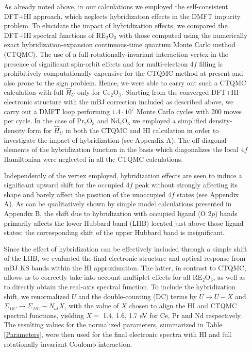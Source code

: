 \documentclass[aps,prb,twocolumn,amsmath,amssymb]{revtex4}
\begin{document}
As already noted above, in our calculations we employed the self-consistent DFT+HI approach, which neglects hybridization effects in the DMFT impurity problem. To elucidate the impact of  hybridization effects, we compared  the DFT+HI spectral functions of RE$_2$O$_3$ with those computed using the numerically exact hybridization-expansion continuous-time quantum Monte Carlo method (CTQMC)\cite{Werner2006,triqs_main,Seth2016}. The use of a full rotationally-invariant interaction vertex in the presence of significant spin-orbit effects and for multi-electron 4$f$ filling is prohibitively computationally expensive for the CTQMC method at present and also prone to the sign problem\cite{Gull2011}. Hence, we were able to carry out such a CTQMC calculation with full $\hat{H}_U$ only for Ce$_2$O$_3$.  Starting from the converged DFT+HI electronic structure with the mBJ correction included as described above, we carry out a DMFT loop performing $1.4\cdot10^{7}$ Monte Carlo cycles with 200 moves per cycle. In the case of Pr$_2$O$_3$ and Nd$_2$O$_3$ we employed  a simplified density-density form for $\hat{H}_{U}$ in both the  CTQMC and HI calculation in order to investigate the impact of hybridization (see Appendix A). The off-diagonal elements of the hybridization function in the basis which diagonalizes the local 4$f$ Hamiltonian were neglected in all the CTQMC calculations.


Independently of the vertex employed,  hybridization effects are seen to induce a significant upward shift for the occupied 4$f$ peak without strongly affecting its shape and barely affect the position of the unoccupied 4$f$ states (see Appendix A).  As can be qualitatively shown by simple model calculations presented  in Appendix B,   the shift due to hybridization with occupied ligand (O 2$p$) bands primarily affects the lower Hubbard band (LHB) located just above those ligand states; the corresponding shift of  the upper Hubbard band is insignificant. 
 
Since the effect of hybridization can be effectively included through a simple shift of  the LHB, we evaluated the final electronic structure and optical response from mBJ KS bands within the HI approximation. The latter, in contrast to CTQMC, allows us to correctly take into account multiplet effects for all RE$_2$O$_3$, as well as to directly obtain the real-axis spectral function.  To include the hybridization shift, we  renormalized  $U$ and the double-counting (DC) terms by $U \rightarrow U-X$ and $\Sigma_{DC} \rightarrow \Sigma_{DC}-N_{at}X$,
with the value of $X$ chosen to align the HI and CTQMC spectral functions, yielding $X=$ 1.4, 1.6, 1.7 eV for Ce, Pr and Nd respectively. The resulting values for the normalized parameters, summarized in Table \ref{Parameters}, were then used for the final electronic spectra with HI and full rotationally-invariant Coulomb interaction. 
 
\end{document}
